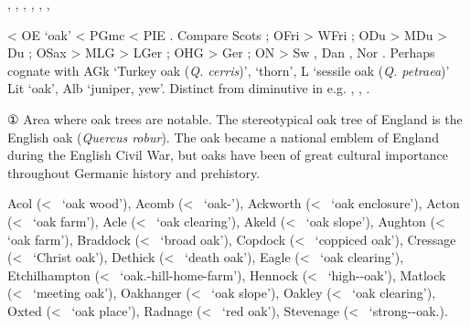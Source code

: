 \documentclass[12pt,letterpaper,oneside,article,draft]{memoir}
\begin{document}
\begin{Lemma}
\begin{Also}
	, , , , , , 
\end{Also}
\begin{Etymology}
	< OE  ‘oak’ < PGmc  < PIE .
	Compare
	Scots ;
	OFri  > WFri ;
	ODu  > MDu  > Du ;
	OSax  > MLG  > LGer ;
	OHG  > Ger ;
	ON  > Sw , Dan , Nor .
	Perhaps cognate with
	AGk   ‘Turkey oak (\textit{Q. cerris})’,   ‘thorn’,
		L  ‘sessile oak (\textit{Q. petraea})’ Lit  ‘oak’, Alb  ‘juniper, yew’.
	Distinct from diminutive  in e.g. , , .
\end{Etymology}
\begin{Definitions}
	① Area where oak trees are notable. The stereotypical oak tree of England is the English oak (\textit{Quercus robur}). The oak became a national emblem of England during the English Civil War, but oaks have been of great cultural importance throughout Germanic history and prehistory.
\end{Definitions}
\begin{Examples}
	Acol (<~ ‘oak wood’),
	Acomb (<~ ‘oak-’),
	Ackworth (<~ ‘oak enclosure’),
	Acton (<~ ‘oak farm’),
	Acle (<~ ‘oak clearing’),
	Akeld (<~ ‘oak slope’),
	Aughton (<~ ‘oak farm’),
	Braddock (<~ ‘broad oak’),
	Copdock (<~ ‘coppiced oak’),
	Cressage (<~ ‘Christ oak’),
	Dethick (<~ ‘death oak’),
	Eagle (<~ ‘oak clearing’),
	Etchilhampton (<~ ‘oak.-hill-home-farm’),
	Hennock (<~ ‘high--oak’),
	Matlock (<~ ‘meeting oak’),
	Oakhanger (<~ ‘oak slope’),
	Oakley (<~ ‘oak clearing’),
	Oxted (<~ ‘oak place’),
	Radnage (<~ ‘red oak’),
	Stevenage (<~ ‘strong--oak.).
\end{Examples}
\end{Lemma}
\end{document}

